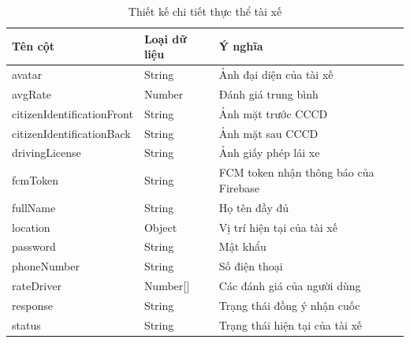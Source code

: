 \documentclass[../DoAn.tex]{subfiles}
\begin{document}
\begin{table}[H]
    \centering
    \begin{tabular}{|l|l|l|}
    \hline
    \textbf{Tên cột}           & \textbf{Loại dữ liệu} & \textbf{Ý nghĩa}                      \\ \hline
    avatar                     & String                & Ảnh đại diện của tài xế               \\ \hline
    avgRate                    & Number                & Đánh giá trung bình                   \\ \hline
    citizenIdentificationFront & String                & Ảnh mặt trước CCCD                    \\ \hline
    citizenIdentificationBack  & String                & Ảnh mặt sau CCCD                      \\ \hline
    drivingLicense             & String                & Ảnh giấy phép lái xe                  \\ \hline
    fcmToken                   & String                & FCM token nhận thông báo của Firebase \\ \hline
    fullName                   & String                & Họ tên đầy đủ                         \\ \hline
    location                   & Object                & Vị trí hiện tại của tài xế            \\ \hline
    password                   & String                & Mật khẩu                              \\ \hline
    phoneNumber                & String                & Số điện thoại                         \\ \hline
    rateDriver                 & Number[]              & Các đánh giá của người dùng           \\ \hline
    response                   & String                & Trạng thái đồng ý nhận cuốc           \\ \hline
    status                     & String                & Trạng thái hiện tại của tài xế        \\ \hline
    \end{tabular}
    \caption{Thiết kế chi tiết thực thể tài xế}
    \label{table:Thiết_kế_chi_tiết_thực_thể_tài_xế}
\end{table}
\end{document}

